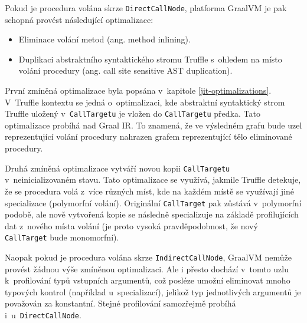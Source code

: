 \documentclass[
  master,
  biblatex,
  figures=true,
  theorems,
  sourcecodes,
  glossaries,
  index
]{kidiplom}
\begin{document}
Pokud je procedura volána skrze \texttt{DirectCallNode}, platforma GraalVM je pak schopná provést následující optimalizace: 

\begin{itemize}
    \item Eliminace volání metod (ang. method inlining).
    \item Duplikaci abstraktního syntaktického stromu Truffle s~ohledem na místo volání procedury (ang. call site sensitive AST duplication).
\end{itemize}


První zmíněná optimalizace byla popsána v~kapitole \ref{jit-optimalizations}. V~Truffle kontextu se jedná o~optimalizaci, kde abstraktní syntaktický strom Truffle uložený v~\texttt{CallTargetu} je vložen do \texttt{CallTargetu} předka. Tato optimalizace probíhá nad Graal IR. To znamená, že ve výsledném grafu bude uzel reprezentující volání procedury nahrazen grafem reprezentující tělo eliminované procedury.  

Druhá zmíněná optimalizace vytváří novou kopii \texttt{CallTargetu} v~neinicializovaném stavu. Tato optimalizace se využívá, jakmile Truffle detekuje, že se procedura volá z~více různých míst, kde na každém místě se využívají jiné specializace (polymorfní volání). Originální \texttt{CallTarget} pak zůstává v~polymorfní podobě, ale nově vytvořená kopie se následně specializuje na základě profilujících dat z~nového místa volání (je proto vysoká pravděpodobnost, že nový \texttt{CallTarget} bude monomorfní). 

 
Naopak pokud je procedura volána skrze \texttt{IndirectCallNode}, GraalVM nemůže provést žádnou výše zmíněnou optimalizaci. Ale i přesto dochází v~tomto uzlu k~profilování typů vstupních argumentů, což posléze umožní eliminovat mnoho typových kontrol (například u~specializací), jelikož typ jednotlivých argumentů je považován za konstantní. Stejné profilování samozřejmě probíhá i~u~\texttt{DirectCallNode}.
\end{document}
